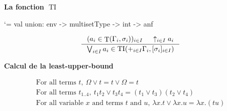 \documentclass{beamer}
\newcommand\heading[1]{%
  \par\bigskip
  {\Large\bfseries#1}\par\smallskip}
\let\origlstlisting=\lstlisting
\let\endoriglstlisting=\endlstlisting
\renewenvironment{lstlisting}
{\mathcode`\-=\hyphenmathcode
    \everymath{}\mathsurround=0pt\origlstlisting}
{\endoriglstlisting}
\DeclareMathOperator{\iT}{T}
\DeclareMathOperator{\iTI}{TI}
\begin{document}
    \begin{frame}[containsverbatim]
    \heading{La fonction $\iTI$}
    \begin{lstlisting}
 val union: env -> multisetType -> int -> anf
    \end{lstlisting}
    
    \begin{displaymath}
        \inference[]{(a_i \in \iT(\Gamma_i, \sigma_i))_{i \in I} & \uparrow_{i \in I}a_i}{ \bigvee_{i \in I} a_i \in \iTI(+_{i \in I}\Gamma_i, [\sigma_i]_{i \in I}) }
    \end{displaymath}
    
    \heading{Calcul de la least-upper-bound}
    \begin{gather*}
        \text{For all terms }t,\ \Omega \vee t = t \vee \Omega = t 
        \\
        \text{For all terms }t_{1..4},\ t_1t_2\vee t_3t_4 = (t_1\vee t_3)(t_2\vee t_4) \\
        \text{For all variable $x$ and terms $t$ and $u$, } \lambda x.t \vee \lambda x.u = \lambda x.(tu)
    \end{gather*}
    
    \end{frame}
    
\end{document}
